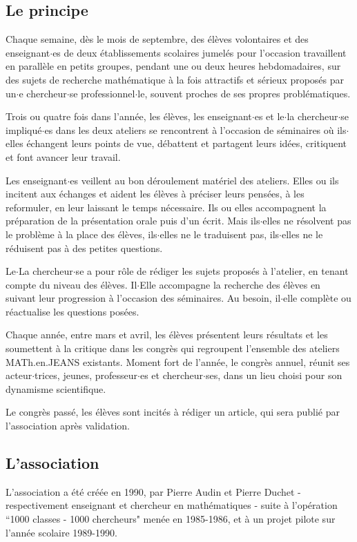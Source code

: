 \subsection*{Le principe} 
Chaque semaine, d\`es le mois de septembre, des \'el\`eves volontaires et des enseignant$\cdot$es de deux \'etablissements scolaires jumel\'es pour l'occasion travaillent en parall\`ele en petits groupes, pendant une ou deux heures hebdomadaires, sur des sujets de recherche math\'ematique \`a la fois attractifs et s\'erieux propos\'es par un$\cdot$e chercheur$\cdot$se professionnel$\cdot$le, souvent proches de ses propres probl\'ematiques.

Trois ou quatre fois dans l'ann\'ee, les \'el\`eves, les enseignant$\cdot$es et le$\cdot$la chercheur$\cdot$se impliqu\'e$\cdot$es dans les deux ateliers se rencontrent \`a l'occasion de \og{}s\'eminaires\fg{} o\`u ils$\cdot$elles \'echangent leurs points de vue, d\'ebattent et partagent leurs id\'ees, critiquent et font avancer leur travail.

Les enseignant$\cdot$es veillent au bon d\'eroulement mat\'eriel des ateliers. Elles ou ils incitent aux \'echanges et aident les \'el\`eves \`a pr\'eciser leurs pens\'ees, \`a les reformuler, en leur laissant le temps n\'ecessaire. Ils ou elles accompagnent la pr\'eparation de la pr\'esentation orale puis d'un \'ecrit. Mais ils$\cdot$elles ne r\'esolvent pas le probl\`eme \`a la place des \'el\`eves, ils$\cdot$elles ne le traduisent pas, ils$\cdot$elles ne le r\'eduisent pas \`a des petites questions.

Le$\cdot$La chercheur$\cdot$se a pour r\^ole de r\'ediger les sujets propos\'es \`a l'atelier, en tenant compte du niveau des \'el\`eves. Il$\cdot$Elle accompagne la recherche des \'el\`eves en suivant leur progression \`a l'occasion des s\'eminaires. Au besoin, il$\cdot$elle compl\`ete ou r\'eactualise les questions pos\'ees.

Chaque ann\'ee, entre mars et avril, les \'el\`eves pr\'esentent leurs r\'esultats et les soumettent \`a la critique dans les congr\`es qui regroupent l'ensemble des ateliers MATh.en.JEANS existants. Moment fort de l'ann\'ee, le congr\`es annuel, r\'eunit ses acteur$\cdot$trices, jeunes, professeur$\cdot$es et chercheur$\cdot$ses, dans un lieu choisi pour son dynamisme scientifique.

Le congr\`es pass\'e,  les \'el\`eves sont incit\'es \`a r\'ediger un article, qui sera publi\'e par l'association apr\`es validation.

\subsection*{L'association}
L'association a \'et\'e cr\'e\'ee en 1990, par Pierre Audin et Pierre Duchet - respectivement enseignant et chercheur en math\'ematiques - suite \`a l'op\'eration ``1000 classes - 1000 chercheurs" men\'ee en 1985-1986, et \`a un projet pilote sur l'ann\'ee scolaire 1989-1990.

